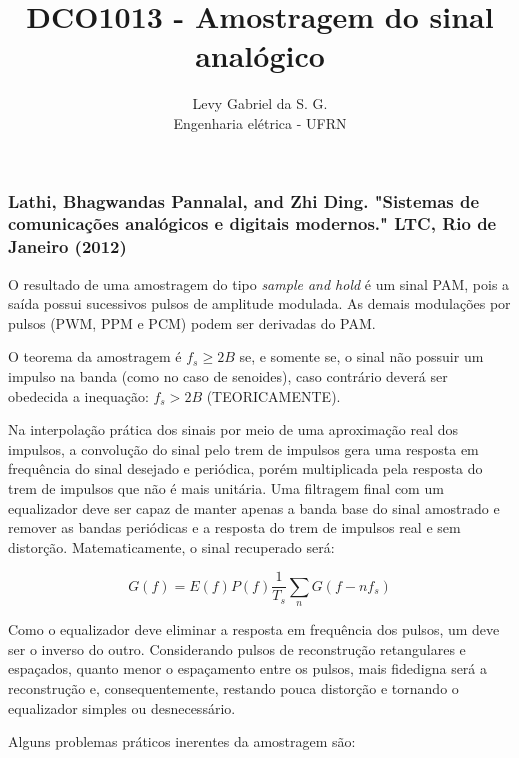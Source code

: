 \title{DCO1013 - Amostragem do sinal analógico}
\author{Levy Gabriel da S. G. \\ Engenharia elétrica - UFRN}

\maketitle
\thispagestyle{fancy}

\subsubsection*{Lathi, Bhagwandas Pannalal, and Zhi Ding. "Sistemas de comunicações analógicos e digitais modernos." LTC, Rio de Janeiro (2012)}

O resultado de uma amostragem do tipo \textit{sample and hold} é um sinal PAM, pois a saída possui sucessivos pulsos de amplitude modulada. As demais modulações por pulsos (PWM, PPM e PCM) podem ser derivadas do PAM.

O teorema da amostragem é $f_s \geq 2B$ se, e somente se, o sinal não possuir um impulso na banda (como no caso de senoides), caso contrário deverá ser obedecida a inequação: $f_s > 2B$ (TEORICAMENTE). 

Na interpolação prática dos sinais por meio de uma aproximação real dos impulsos, a convolução do sinal pelo trem de impulsos gera uma resposta em frequência do sinal desejado e periódica, porém multiplicada pela resposta do trem de impulsos que não é mais unitária. Uma filtragem final com um equalizador deve ser capaz de manter apenas a banda base do sinal amostrado e remover as bandas periódicas e a resposta do trem de impulsos real e sem distorção. Matematicamente, o sinal recuperado será:

\begin{equation}
    G(f) = E(f)P(f)\frac{1}{T_s}\sum_n G(f-nf_s)
\end{equation}

Como o equalizador deve eliminar a resposta em frequência dos pulsos, um deve ser o inverso do outro. Considerando pulsos de reconstrução retangulares e espaçados, quanto menor o espaçamento entre os pulsos, mais fidedigna será a reconstrução e, consequentemente, restando pouca distorção e tornando o equalizador simples ou desnecessário.

Alguns problemas práticos inerentes da amostragem são: 

